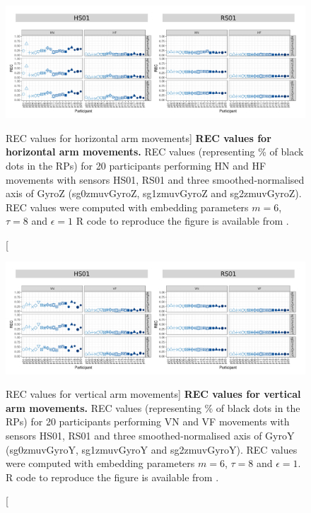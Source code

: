 \begin{figure}
\centering
\includegraphics[width=1.0\textwidth]{rec_aH}
    \caption
	[REC values for horizontal arm movements]{
	{\bf REC values for horizontal arm movements.}	
	REC values (representing \% of black dots in the RPs) for 
	20 participants performing HN and HF movements
	with sensors HS01, RS01 and three smoothed-normalised axis 
	of GyroZ (sg0zmuvGyroZ, sg1zmuvGyroZ and sg2zmuvGyroZ).
	REC values were computed with 
	embedding parameters $m=6$, $\tau=8$ and $\epsilon=1$
	R code to reproduce the figure is available from \cite{xochicale2018}.
        }
    \label{fig:rec_aH}
\end{figure}
\begin{figure}
\centering
\includegraphics[width=1.0\textwidth]{rec_aV}
    \caption
	[REC values for vertical arm movements]{
	{\bf REC values for vertical arm movements.}	
	REC values (representing \% of black dots in the RPs) for 
	20 participants performing VN and VF movements
	with sensors HS01, RS01 and three smoothed-normalised axis 
	of GyroY (sg0zmuvGyroY, sg1zmuvGyroY and sg2zmuvGyroY).
	REC values were computed with 
	embedding parameters $m=6$, $\tau=8$ and $\epsilon=1$.
	R code to reproduce the figure is available from \cite{xochicale2018}.
        }
    \label{fig:rec_aV}
\end{figure}


